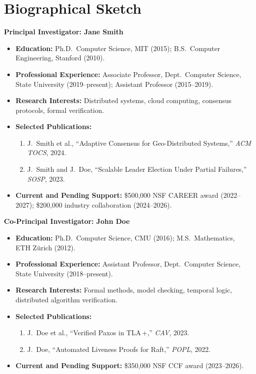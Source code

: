 \documentclass[
    language=english,
    doctype=grant-proposal,
    institution=none,
]{../../omnilatex}
\begin{document}
\newpage

\section*{Biographical Sketch}

\textbf{Principal Investigator: Jane Smith}
\begin{itemize}
    \item \textbf{Education:} Ph.D.\ Computer Science, MIT (2015);
          B.S.\ Computer Engineering, Stanford (2010).
    \item \textbf{Professional Experience:} Associate Professor,
          Dept.\ Computer Science, State University (2019--present);
          Assistant Professor (2015--2019).
    \item \textbf{Research Interests:} Distributed systems, cloud
          computing, consensus protocols, formal verification.
    \item \textbf{Selected Publications:}
          \begin{enumerate}
              \item J.\ Smith et al., ``Adaptive Consensus for
                    Geo-Distributed Systems,'' \emph{ACM TOCS}, 2024.
              \item J.\ Smith and J.\ Doe, ``Scalable Leader
                    Election Under Partial Failures,'' \emph{SOSP}, 2023.
          \end{enumerate}
    \item \textbf{Current and Pending Support:}
          \$500{,}000 NSF CAREER award (2022--2027);
          \$200{,}000 industry collaboration (2024--2026).
\end{itemize}

\textbf{Co-Principal Investigator: John Doe}
\begin{itemize}
    \item \textbf{Education:} Ph.D.\ Computer Science, CMU (2016);
          M.S.\ Mathematics, ETH Zürich (2012).
    \item \textbf{Professional Experience:} Assistant Professor,
          Dept.\ Computer Science, State University (2018--present).
    \item \textbf{Research Interests:} Formal methods, model checking,
          temporal logic, distributed algorithm verification.
    \item \textbf{Selected Publications:}
          \begin{enumerate}
              \item J.\ Doe et al., ``Verified Paxos in TLA\,+,''
                    \emph{CAV}, 2023.
              \item J.\ Doe, ``Automated Liveness Proofs for Raft,''
                    \emph{POPL}, 2022.
          \end{enumerate}
    \item \textbf{Current and Pending Support:}
          \$350{,}000 NSF CCF award (2023--2026).
\end{itemize}
\end{document}
